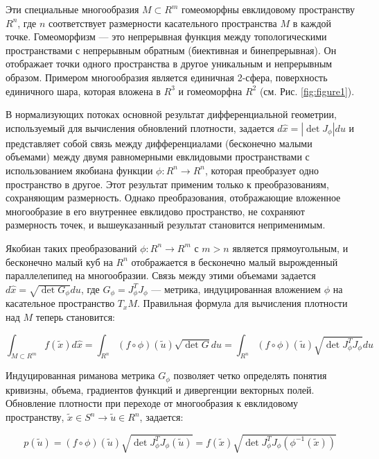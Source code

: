 \documentclass{article}
\begin{document}
Эти специальные многообразия \( M \subset R^m \) гомеоморфны евклидовому пространству \( R^n \), где \( n \) соответствует размерности касательного пространства \( M \) в каждой точке. Гомеоморфизм — это непрерывная функция между топологическими пространствами с непрерывным обратным (биективная и бинепрерывная). Он отображает точки одного пространства в другое уникальным и непрерывным образом. Примером многообразия является единичная 2-сфера, поверхность единичного шара, которая вложена в \( R^3 \) и гомеоморфна \( R^2 \) (см. Рис. \ref{fig:figure1}).

В нормализующих потоках основной результат дифференциальной геометрии, используемый для вычисления обновлений плотности, задается \( d\hat{x} = |\det J_\phi| du \) и представляет собой связь между дифференциалами (бесконечно малыми объемами) между двумя равномерными евклидовыми пространствами с использованием якобиана функции \( \phi : R^n \rightarrow R^n \), которая преобразует одно пространство в другое. Этот результат применим только к преобразованиям, сохраняющим размерность. Однако преобразования, отображающие вложенное многообразие в его внутреннее евклидово пространство, не сохраняют размерность точек, и вышеуказанный результат становится неприменимым.

Якобиан таких преобразований \( \phi : R^n \rightarrow R^m \) с \( m > n \) является прямоугольным, и бесконечно малый куб на \( R^n \) отображается в бесконечно малый вырожденный параллелепипед на многообразии. Связь между этими объемами задается \( d\hat{x} = \sqrt{\det G_\phi} du \), где \( G_\phi = J_\phi^T J_\phi \) — метрика, индуцированная вложением \( \phi \) на касательное пространство \( T_xM \). Правильная формула для вычисления плотности над \( M \) теперь становится:

\begin{equation}
    \int_{M \subset R^m} f(\tilde{x}) d\hat{x} = \int_{R^n} (f \circ \phi)(\tilde{u}) \sqrt{\det G} du = \int_{R^n} (f \circ \phi)(\tilde{u}) \sqrt{\det J_\phi^T J_\phi} du
    \label{eq:density_update}
\end{equation}

Индуцированная риманова метрика \( G_\phi \) позволяет четко определять понятия кривизны, объема, градиентов функций и дивергенции векторных полей. Обновление плотности при переходе от многообразия к евклидовому пространству, \( \tilde{x} \in S^n \rightarrow \tilde{u} \in R^n \), задается:

\begin{equation}
    p(\tilde{u}) = (f \circ \phi)(\tilde{u}) \sqrt{\det J_\phi^T J_\phi(\tilde{u})} = f(\tilde{x}) \sqrt{\det J_\phi^T J_\phi(\phi^{-1}(\tilde{x}))}
    \label{eq:density_update_manifold}
\end{equation}
\end{document}
